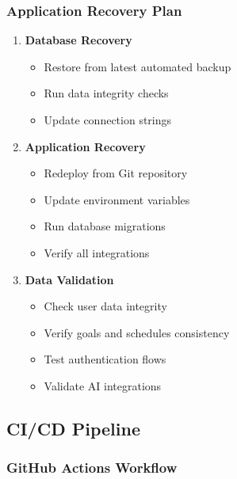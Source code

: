 \subsubsection{Application Recovery Plan}

\begin{enumerate}
\item \textbf{Database Recovery}
   \begin{itemize}
   \item Restore from latest automated backup
   \item Run data integrity checks
   \item Update connection strings
   \end{itemize}

\item \textbf{Application Recovery}
   \begin{itemize}
   \item Redeploy from Git repository
   \item Update environment variables
   \item Run database migrations
   \item Verify all integrations
   \end{itemize}

\item \textbf{Data Validation}
   \begin{itemize}
   \item Check user data integrity
   \item Verify goals and schedules consistency
   \item Test authentication flows
   \item Validate AI integrations
   \end{itemize}
\end{enumerate}

\subsection{CI/CD Pipeline}

\subsubsection{GitHub Actions Workflow}

